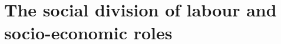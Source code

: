 \section{The social division of labour and socio-economic roles}
\label{sec:SocialDivisionOfLabour}

